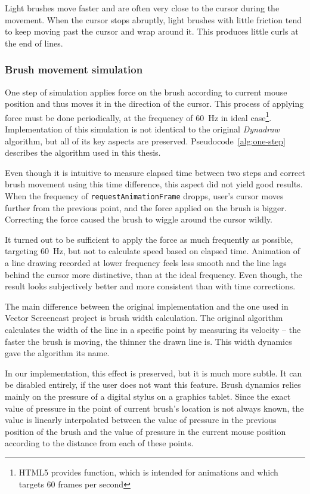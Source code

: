 Light brushes move faster and are often very close to the cursor during the movement. When the cursor stops abruptly, light brushes with little friction tend to keep moving past the cursor and wrap around it. This produces little curls at the end of lines.

\subsubsection*{Brush movement simulation}

One step of simulation applies force on the brush according to current mouse position and thus moves it in the direction of the cursor. This process of applying force must be done periodically, at the frequency of 60~Hz in ideal case\footnote{HTML5 provides  function, which is intended for animations and which targets 60 frames per second}. Implementation of this simulation is not identical to the original \textit{Dynadraw} algorithm, but all of its key aspects are preserved. Pseudocode~\ref{alg:one-step} describes the algorithm used in this thesis.

Even though it is intuitive to measure elapsed time between two steps and correct brush movement using this time difference, this aspect did not yield good results. When the frequency of \verb|requestAnimationFrame| dropps, user's cursor moves further from the previous point, and the force applied on the brush is bigger. Correcting the force caused the brush to wiggle around the cursor wildly.

It turned out to be sufficient to apply the force as much frequently as possible, targeting 60~Hz, but not to calculate speed based on elapsed time. Animation of a line drawing recorded at lower frequency feels less smooth and the line lags behind the cursor more distinctive, than at the ideal frequency. Even though, the result looks subjectively better and more consistent than with time corrections.

The main difference between the original implementation and the one used in Vector Screencast project is brush width calculation. The original algorithm calculates the width of the line in a specific point by measuring its velocity -- the faster the brush is moving, the thinner the drawn line is. This width dynamics gave the algorithm its name.

In our implementation, this effect is preserved, but it is much more subtle. It can be disabled entirely, if the user does not want this feature. Brush dynamics relies mainly on the pressure of a digital stylus on a graphics tablet. Since the exact value of pressure in the point of current brush's location is not always known, the value is linearly interpolated between the value of pressure in the previous position of the brush and the value of pressure in the current mouse position according to the distance from each of these points.

